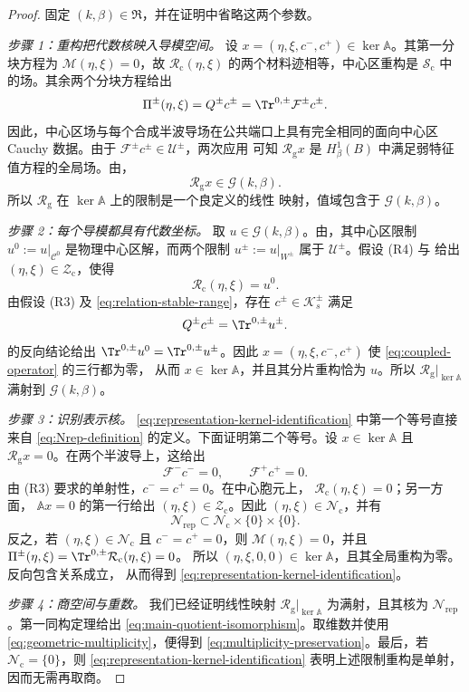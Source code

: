 \begin{proof}
固定 $(k,\beta)\in\mathfrak R$，并在证明中省略这两个参数。

\emph{步骤 1：重构把代数核映入导模空间。}
设 $x=(\eta,\xi,c^-,c^+)\in\ker\mathbb A$。其第一分块方程为
$\mathcal M(\eta,\xi)=0$，故
$\mathcal R_{\mathrm c}(\eta,\xi)$ 的两个材料迹相等，中心区重构是
$\mathcal S_{\mathrm c}$ 中的场。其余两个分块方程给出
\[
  \Pi^\pm(\eta,\xi)=Q^\pm c^\pm
  =\Tr^{0,\pm}\mathcal F^\pm c^\pm.
\]
因此，中心区场与每个合成半波导场在公共端口上具有完全相同的面向中心区
Cauchy 数据。由于
$\mathcal F^\pm c^\pm\in\mathcal U^\pm$，两次应用
 可知 $\mathcal R_{\mathrm g}x$ 是
$H^1_\beta(B)$ 中满足弱特征值方程的全局场。由，
\[
  \mathcal R_{\mathrm g}x\in\mathcal G(k,\beta).
\]
所以 $\mathcal R_{\mathrm g}$ 在 $\ker\mathbb A$ 上的限制是一个良定义的线性
映射，值域包含于 $\mathcal G(k,\beta)$。

\emph{步骤 2：每个导模都具有代数坐标。}
取 $u\in\mathcal G(k,\beta)$。由，其中心区限制
$u^0:=u|_{\mathcal C^0}$ 是物理中心区解，而两个限制
$u^\pm:=u|_{W^\pm}$ 属于
$\mathcal U^\pm$。假设 (R4) 与
 给出
$(\eta,\xi)\in\mathcal Z_{\mathrm c}$，使得
\[
  \mathcal R_{\mathrm c}(\eta,\xi)=u^0.
\]
由假设 (R3) 及 \eqref{eq:relation-stable-range}，存在
$c^\pm\in\mathcal K_s^\pm$ 满足
\[
  Q^\pm c^\pm=\Tr^{0,\pm}u^\pm.
\]
 的反向结论给出
$\Tr^{0,\pm}u^0=\Tr^{0,\pm}u^\pm$。因此
$x=(\eta,\xi,c^-,c^+)$ 使 \eqref{eq:coupled-operator} 的三行都为零，
从而 $x\in\ker\mathbb A$，并且其分片重构恰为 $u$。所以
$\mathcal R_{\mathrm g}|_{\ker\mathbb A}$ 满射到
$\mathcal G(k,\beta)$。

\emph{步骤 3：识别表示核。}
\eqref{eq:representation-kernel-identification} 中第一个等号直接来自
\eqref{eq:Nrep-definition} 的定义。下面证明第二个等号。设
$x\in\ker\mathbb A$ 且 $\mathcal R_{\mathrm g}x=0$。在两个半波导上，这给出
\[
  \mathcal F^-c^-=0,
  \qquad
  \mathcal F^+c^+=0.
\]
由 (R3) 要求的单射性，$c^-=c^+=0$。在中心胞元上，
$\mathcal R_{\mathrm c}(\eta,\xi)=0$；另一方面，
$\mathbb A x=0$ 的第一行给出
$(\eta,\xi)\in\mathcal Z_{\mathrm c}$。因此
$(\eta,\xi)\in\mathcal N_{\mathrm c}$，并有
\[
  \mathcal N_{\mathrm{rep}}
  \subset\mathcal N_{\mathrm c}\times\{0\}\times\{0\}.
\]
反之，若 $(\eta,\xi)\in\mathcal N_{\mathrm c}$ 且 $c^-=c^+=0$，则
$\mathcal M(\eta,\xi)=0$，并且
$\Pi^\pm(\eta,\xi)
=\Tr^{0,\pm}\mathcal R_{\mathrm c}(\eta,\xi)=0$。
所以 $(\eta,\xi,0,0)\in\ker\mathbb A$，且其全局重构为零。反向包含关系成立，
从而得到 \eqref{eq:representation-kernel-identification}。

\emph{步骤 4：商空间与重数。}
我们已经证明线性映射
$\mathcal R_{\mathrm g}|_{\ker\mathbb A}$ 为满射，且其核为
$\mathcal N_{\mathrm{rep}}$。第一同构定理给出
\eqref{eq:main-quotient-isomorphism}。取维数并使用
\eqref{eq:geometric-multiplicity}，便得到
\eqref{eq:multiplicity-preservation}。最后，若
$\mathcal N_{\mathrm c}=\{0\}$，则
\eqref{eq:representation-kernel-identification} 表明上述限制重构是单射，
因而无需再取商。
\end{proof}

